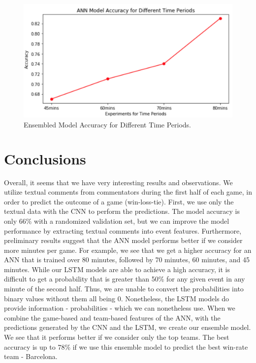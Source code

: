 \documentclass[11pt,a4paper]{article}
\begin{document}
\begin{figure}
\includegraphics[width=\columnwidth]{./img/fig-3.png}
\caption{\label{min-acc-figure} Ensembled Model Accuracy for Different Time Periods.}
\end{figure}


\section{Conclusions}

Overall, it seems that we have very interesting results and observations. We utilize textual comments from commentators during the first half of each game, in order to predict the outcome of a game (win-loss-tie). First, we use only the textual data with the CNN to perform the predictions. The model accuracy is only 66\% with a randomized validation set, but we can improve the model performance by extracting textual comments into event features. Furthermore, preliminary results suggest that the ANN model performs better if we consider more minutes per game. For example, we see that we get a higher accuracy for an ANN that is trained over 80 minutes, followed by 70 minutes, 60 minutes, and 45 minutes. While our LSTM models are able to achieve a high accuracy, it is difficult to get a probability that is greater than 50\% for any given event in any minute of the second half. Thus, we are unable to convert the probabilities into binary values without them all being 0. Nonetheless, the LSTM models do provide information - probabilities - which we can nonetheless use. When we combine the game-based and team-based features of the ANN, with the predictions generated by the CNN and the LSTM, we create our ensemble model. We see that it performs better if we consider only the top teams. The best accuracy is up to 78\% if we use this ensemble model to predict the best win-rate team - Barcelona.



\end{document}

